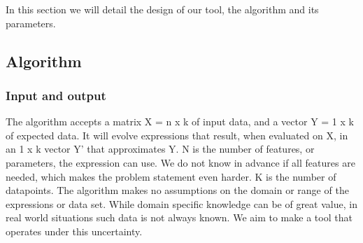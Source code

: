 In this section we will detail the design of our tool, the algorithm and its parameters.
\subsection{Algorithm}
\subsubsection{Input and output}
The algorithm accepts a matrix X = n x k of input data, and a vector Y = 1 x k of expected data. It will evolve expressions that result, when evaluated on X, in an 1 x k vector Y' that approximates Y. N is the number of features, or parameters, the expression can use. We do not know in advance if all features are needed, which makes the problem statement even harder.
K is the number of datapoints. The algorithm makes no assumptions on the domain or range of the expressions or data set. While domain specific knowledge can be of great value, in real world situations such data is not always known. We aim to make a tool that operates under this uncertainty.
